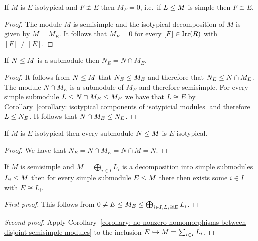 \begin{corollary}
  \label{corollary: isotypical components of isotypicial modules}
  If $M$ is $E$-isotypical and $F \ncong E$ then $M_F = 0$, i.e.\ if $L \leq M$ is simple then $F \cong E$.
\end{corollary}


\begin{proof}
  The module $M$ is semisimple and the isotypical decomposition of $M$ is given by $M = M_E$.
  It follows that $M_F = 0$ for every $[F] \in \operatorname{Irr}(R)$ with $[F] \neq [E]$.
\end{proof}


\begin{lemma}
  If $N \leq M$ is a submodule then $N_E = N \cap M_E$.
\end{lemma}


\begin{proof}
  It follows from $N \leq M$ that $N_E \leq M_E$ and therefore that $N_E \leq N \cap M_E$.
  The module $N \cap M_E$ is a submodule of $M_E$ and therefore semisimple.
  For every simple submodule $L \leq N \cap M_E \leq M_E$ we have that $L \cong E$ by Corollary~\ref{corollary: isotypical components of isotypicial modules} and therefore $L \leq N_E$.
  It follows that $N \cap M_E \leq N_E$.
\end{proof}


\begin{corollary}
  If $M$ is $E$-isotypical then every submodule $N \leq M$ is $E$-isotypical.
\end{corollary}


\begin{proof}
  We have that $N_E = N \cap M_E = N \cap M = N$.
\end{proof}


\begin{lemma}
  If $M$ is semisimple and $M = \bigoplus_{i \in I} L_i$ is a decomposition into simple submodules $L_i \leq M$ then for every simple submodule $E \leq M$ there then exists some $i \in I$ with $E \cong L_i$.
\end{lemma}


\begin{proof}[First proof]
  This follows from $0 \neq E \leq M_E \leq \bigoplus_{i \in I, L_i \cong E} L_i$.
\end{proof}


\begin{proof}[Second proof]
  Apply Corollary~\ref{corollary: no nonzero homomorphisms between disjoint semisimple modules} to the inclusion $E \hookrightarrow M = \sum_{i \in I} L_i$.  
\end{proof}


